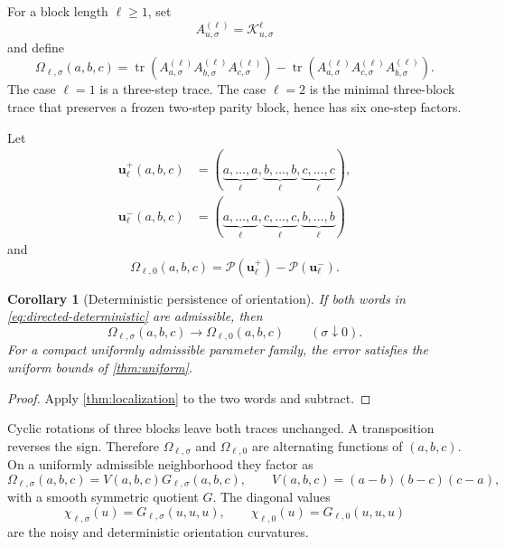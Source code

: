 \documentclass[11pt]{article}
\newtheorem{corollary}[theorem]{Corollary}
\theoremstyle{remark}
\DeclareMathOperator{\tr}{tr}
\newcommand{\cK}{\mathcal K}
\newcommand{\cP}{\mathcal P}
\newcommand{\bu}{\boldsymbol u}
\begin{document}
For a block length $\ell\ge1$, set
\begin{equation}
 A_{u,\sigma}^{(\ell)}=\cK_{u,\sigma}^{\ell}
\end{equation}
and define
\begin{equation}
 \Omega_{\ell,\sigma}(a,b,c)=
 \tr\left(A_{a,\sigma}^{(\ell)}A_{b,\sigma}^{(\ell)}A_{c,\sigma}^{(\ell)}\right)
 -\tr\left(A_{a,\sigma}^{(\ell)}A_{c,\sigma}^{(\ell)}A_{b,\sigma}^{(\ell)}\right).
 \label{eq:directed-noisy}
\end{equation}
The case $\ell=1$ is a three-step trace.  The case $\ell=2$ is the minimal
three-block trace that preserves a frozen two-step parity block, hence has six
one-step factors.

Let
\begin{align}
 \bu_{\ell}^{+}(a,b,c)
 &=(\underbrace{a,\ldots,a}_{\ell},
   \underbrace{b,\ldots,b}_{\ell},
   \underbrace{c,\ldots,c}_{\ell}),\\
 \bu_{\ell}^{-}(a,b,c)
 &=(\underbrace{a,\ldots,a}_{\ell},
   \underbrace{c,\ldots,c}_{\ell},
   \underbrace{b,\ldots,b}_{\ell})
\end{align}
and
\begin{equation}
 \Omega_{\ell,0}(a,b,c)=
 \cP(\bu_{\ell}^{+})-\cP(\bu_{\ell}^{-}).
 \label{eq:directed-deterministic}
\end{equation}

\begin{corollary}[Deterministic persistence of orientation]
\label{cor:directed-limit}
If both words in \eqref{eq:directed-deterministic} are admissible, then
\begin{equation}
 \Omega_{\ell,\sigma}(a,b,c)\longrightarrow
 \Omega_{\ell,0}(a,b,c)
 \qquad(\sigma\downarrow0).
 \label{eq:directed-limit}
\end{equation}
For a compact uniformly admissible parameter family, the error satisfies the
uniform bounds of \cref{thm:uniform}.
\end{corollary}

\begin{proof}
Apply \cref{thm:localization} to the two words and subtract.
\end{proof}

Cyclic rotations of three blocks leave both traces unchanged.  A transposition
reverses the sign.  Therefore $\Omega_{\ell,\sigma}$ and
$\Omega_{\ell,0}$ are alternating functions of $(a,b,c)$.  On a uniformly
admissible neighborhood they factor as
\begin{equation}
 \Omega_{\ell,\sigma}(a,b,c)
 =V(a,b,c)G_{\ell,\sigma}(a,b,c),
 \qquad
 V(a,b,c)=(a-b)(b-c)(c-a),
 \label{eq:vandermonde}
\end{equation}
with a smooth symmetric quotient $G$.  The diagonal values
\begin{equation}
 \chi_{\ell,\sigma}(u)=G_{\ell,\sigma}(u,u,u),
 \qquad
 \chi_{\ell,0}(u)=G_{\ell,0}(u,u,u)
 \label{eq:curvatures}
\end{equation}
are the noisy and deterministic orientation curvatures.
\end{document}
